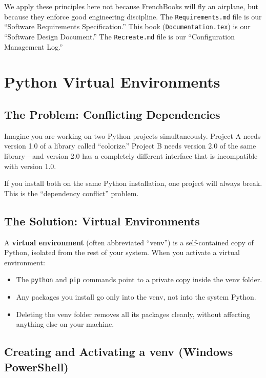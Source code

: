 \documentclass[12pt,oneside]{book}
\begin{document}
We apply these principles here not because FrenchBooks will fly an airplane, but because
they enforce good engineering discipline. The \texttt{Requirements.md} file is our
``Software Requirements Specification.'' This book (\texttt{Documentation.tex}) is our
``Software Design Document.'' The \texttt{Recreate.md} file is our
``Configuration Management Log.''

\chapter{Python Virtual Environments}
\label{ch:venv}

\section{The Problem: Conflicting Dependencies}

Imagine you are working on two Python projects simultaneously. Project A needs version 1.0
of a library called ``colorize.'' Project B needs version 2.0 of the same library—and
version 2.0 has a completely different interface that is incompatible with version 1.0.

If you install both on the same Python installation, one project will always break. This
is the ``dependency conflict'' problem.

\section{The Solution: Virtual Environments}

A \textbf{virtual environment} (often abbreviated ``venv'') is a self-contained copy of
Python, isolated from the rest of your system. When you activate a virtual environment:

\begin{itemize}
  \item The \texttt{python} and \texttt{pip} commands point to a private copy inside the
    venv folder.
  \item Any packages you install go only into the venv, not into the system Python.
  \item Deleting the venv folder removes all its packages cleanly, without affecting
    anything else on your machine.
\end{itemize}

\section{Creating and Activating a venv (Windows PowerShell)}
\end{document}
